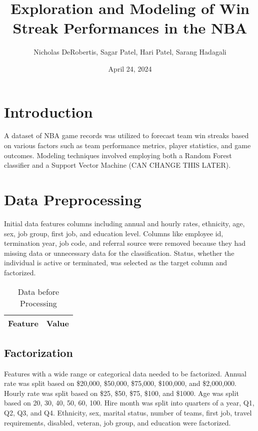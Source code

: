 \documentclass{article} %
\title{Exploration and Modeling of Win Streak Performances in the NBA}
\author{Nicholas DeRobertis, Sagar Patel, Hari Patel, Sarang Hadagali}
\date{April 24, 2024}
\begin{document}
\maketitle

\section{Introduction}

A dataset of NBA game records was utilized to forecast team win streaks based on various factors such as team performance metrics, player statistics, and game outcomes. Modeling techniques involved employing both a Random Forest classifier and a Support Vector Machine (CAN CHANGE THIS LATER).

\section{Data Preprocessing}

Initial data features columns including annual and hourly rates, ethnicity, age, sex, job group, first job, and education level. Columns like employee id, termination year, job code, and referral source were removed because they had missing data or unnecessary data for the classification. Status, whether the individual is active or terminated, was selected as the target column and factorized.

\begin{table}[h]
    \centering
    \caption{Data before Processing}
    \label{tab:before_processing}
    \begin{tabular}{ll}
        \toprule
        Feature & Value \\
        \midrule
        \bottomrule
    \end{tabular}
\end{table}

\subsection{Factorization}

Features with a wide range or categorical data needed to be factorized. Annual rate was split based on \$20,000, \$50,000, \$75,000, \$100,000, and \$2,000,000. Hourly rate was split based on \$25, \$50, \$75, \$100, and \$1000. Age was split based on 20, 30, 40, 50, 60, 100. Hire month was split into quarters of a year, Q1, Q2, Q3, and Q4. Ethnicity, sex, marital status, number of teams, first job, travel requirements, disabled, veteran, job group, and education were factorized.
\end{document}
